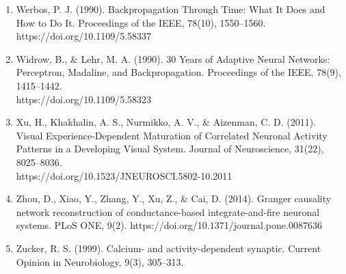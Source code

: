 \documentclass[11pt]{article}
\begin{document}
\begin{enumerate}
\item Werbos, P. J. (1990). Backpropagation Through Time: What It Does and How to Do It. Proceedings of the IEEE, 78(10), 1550–1560. https://doi.org/10.1109/5.58337
\item Widrow, B., \& Lehr, M. A. (1990). 30 Years of Adaptive Neural Networks: Perceptron, Madaline, and Backpropagation. Proceedings of the IEEE, 78(9), 1415–1442.\\https://doi.org/10.1109/5.58323
\item Xu, H., Khakhalin, A. S., Nurmikko, A. V., \& Aizenman, C. D. (2011). Visual Experience-Dependent Maturation of Correlated Neuronal Activity Patterns in a Developing Visual System. Journal of Neuroscience, 31(22), 8025–8036.\\ https://doi.org/10.1523/JNEUROSCI.5802-10.2011
\item Zhou, D., Xiao, Y., Zhang, Y., Xu, Z., \& Cai, D. (2014). Granger causality network reconstruction of conductance-based integrate-and-fire neuronal systems. PLoS ONE, 9(2). https://doi.org/10.1371/journal.pone.0087636
\item Zucker, R. S. (1999). Calcium- and activity-dependent synaptic. Current Opinion in Neurobiology, 9(3), 305–313.
\end{enumerate}
\end{document}
